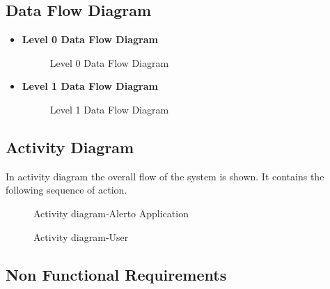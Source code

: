 \documentclass[12pt,a4paper]{report}
\begin{document}
 \subsection{Data Flow Diagram}
 \begin{itemize}
  \item{\textbf{Level 0 Data Flow Diagram}}
 \begin{figure}[!h]
 	\begin{center}
 		\caption{Level 0 Data Flow Diagram}
 	\end{center}
 \end{figure}
 \newpage
 
 \item{\textbf{Level 1 Data Flow Diagram}}
\begin{figure}[!h]
	\begin{center}
		\caption{Level 1 Data Flow Diagram}
	\end{center}
\end{figure}
\end{itemize}

\subsection{Activity Diagram}
In activity diagram the overall flow of the system is shown. It contains the following sequence of action.

\begin{figure}[h]
	\begin{center}
		\caption{Activity diagram-Alerto Application}
	\end{center}
\end{figure}
\newpage
\begin{figure}[h]
	\begin{center}
		\caption{Activity diagram-User}
	\end{center}
\end{figure}

\subsection{Non Functional Requirements}
\end{document}
